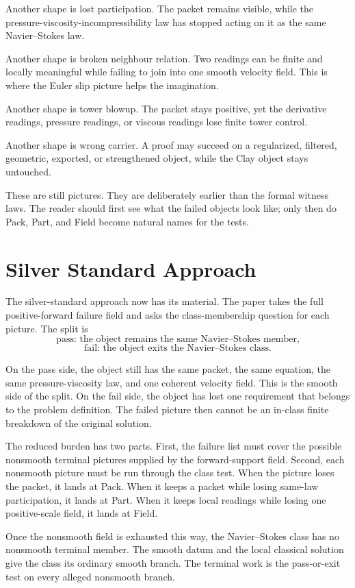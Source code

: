 \documentclass[11pt]{article}
\begin{document}
Another shape is lost participation.
The packet remains visible, while the pressure-viscosity-incompressibility law has stopped acting on it as the same Navier--Stokes law.

Another shape is broken neighbour relation.
Two readings can be finite and locally meaningful while failing to join into one smooth velocity field.
This is where the Euler slip picture helps the imagination.

Another shape is tower blowup.
The packet stays positive, yet the derivative readings, pressure readings, or viscous readings lose finite tower control.

Another shape is wrong carrier.
A proof may succeed on a regularized, filtered, geometric, exported, or strengthened object, while the Clay object stays untouched.

These are still pictures.
They are deliberately earlier than the formal witness laws.
The reader should first see what the failed objects look like; only then do Pack, Part, and Field become natural names for the tests.

\section{Silver Standard Approach}

The silver-standard approach now has its material.
The paper takes the full positive-forward failure field and asks the class-membership question for each picture.
The split is
\[
  \text{pass: the object remains the same Navier--Stokes member,}
\]
\[
  \text{fail: the object exits the Navier--Stokes class.}
\]

On the pass side, the object still has the same packet, the same equation, the same pressure-viscosity law, and one coherent velocity field.
This is the smooth side of the split.
On the fail side, the object has lost one requirement that belongs to the problem definition.
The failed picture then cannot be an in-class finite breakdown of the original solution.

The reduced burden has two parts.
First, the failure list must cover the possible nonsmooth terminal pictures supplied by the forward-support field.
Second, each nonsmooth picture must be run through the class test.
When the picture loses the packet, it lands at Pack.
When it keeps a packet while losing same-law participation, it lands at Part.
When it keeps local readings while losing one positive-scale field, it lands at Field.

Once the nonsmooth field is exhausted this way, the Navier--Stokes class has no nonsmooth terminal member.
The smooth datum and the local classical solution give the class its ordinary smooth branch.
The terminal work is the pass-or-exit test on every alleged nonsmooth branch.
\end{document}
